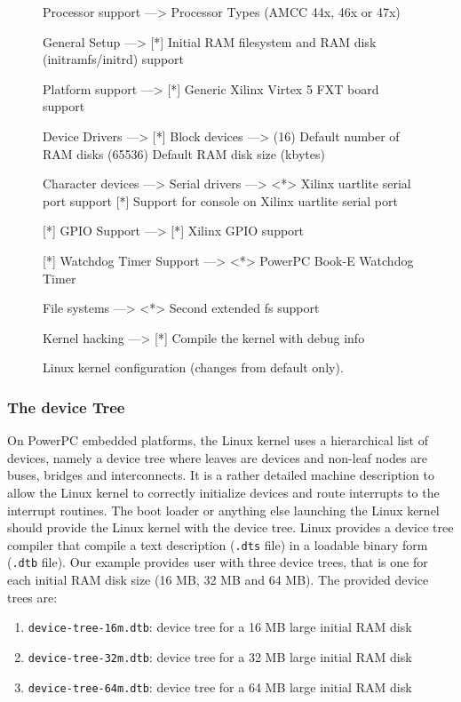 \begin{figure}[p]
\begin{center}
\begin{script}
Processor support  --->
        Processor Types (AMCC 44x, 46x or 47x)

General Setup  --->
    [*] Initial RAM filesystem and RAM disk (initramfs/initrd) support

Platform support  --->
    [*] Generic Xilinx Virtex 5 FXT board support

Device Drivers  --->
    [*] Block devices  --->
        (16)    Default number of RAM disks
         (65536) Default RAM disk size (kbytes)

        Character devices  --->
            Serial drivers  --->
                <*> Xilinx uartlite serial port support
                [*]   Support for console on Xilinx uartlite serial port

    [*] GPIO Support  --->
        [*] Xilinx GPIO support

    [*] Watchdog Timer Support  --->
        <*> PowerPC Book-E Watchdog Timer

File systems  --->
    <*> Second extended fs support

Kernel hacking  --->
    [*] Compile the kernel with debug info
\end{script}
\end{center}
\caption{Linux kernel configuration (changes from default only).}
\label{fig:kernel_configuration}
\end{figure}

\subsubsection{The device Tree}

On PowerPC embedded platforms, the Linux kernel uses a hierarchical list of devices, namely a device tree where leaves are devices and non-leaf nodes are buses, bridges and interconnects.
It is a rather detailed machine description to allow the Linux kernel to correctly initialize devices and route interrupts to the interrupt routines.
The boot loader or anything else launching the Linux kernel should provide the Linux kernel with the device tree.
Linux provides a device tree compiler that compile a text description (\texttt{.dts} file) in a loadable binary form (\texttt{.dtb} file).
Our example provides user with three device trees, that is one for each initial RAM disk size (16 MB, 32 MB and 64 MB).
The provided device trees are:
\begin{enumerate}
\item \texttt{device-tree-16m.dtb}: device tree for a 16 MB large initial RAM disk
\item \texttt{device-tree-32m.dtb}: device tree for a 32 MB large initial RAM disk
\item \texttt{device-tree-64m.dtb}: device tree for a 64 MB large initial RAM disk
\end{enumerate}

